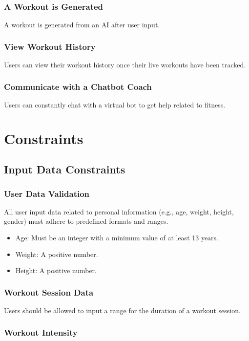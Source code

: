 \documentclass[12pt]{article}
\begin{document}
\subsubsection{A Workout is Generated}
A workout is generated from an AI after user input.

\subsubsection{View Workout History}
Users can view their workout history once their live workouts have been tracked.

\subsubsection{Communicate with a Chatbot Coach}
Users can constantly chat with a virtual bot to get help related to fitness.


\section{Constraints}

\subsection{Input Data Constraints}

\subsubsection{User Data Validation}

All user input data related to personal information (e.g., age, weight, height, gender) must adhere to predefined formats and ranges.

\begin{itemize}
  \item Age: Must be an integer with a minimum value of at least 13 years.
  \item Weight: A positive number.
  \item Height: A positive number.
\end{itemize}

\subsubsection{Workout Session Data}

Users should be allowed to input a range for the duration of a workout session.

\subsubsection{Workout Intensity}
\end{document}
